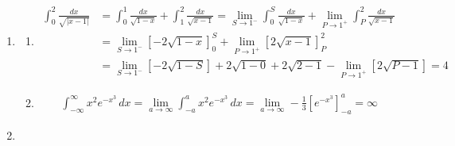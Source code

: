 \documentclass[a4paper, 12pt]{article}
\begin{document}
\begin{enumerate}[leftmargin=*,label=\textbf{\arabic*.}]
\begin{enumerate}[leftmargin=*,label=\textbf{\alph*.}]
\vspace{-2em}
\begin{align*}
\int\sqrt{t-t^2}\,dt=\boxed{\frac14\left[\arcsin\left(\sqrt t\right)-\sqrt{t(1-t)}\cdot(1-2t)\right]+C,\quad C\in\mathbb{R}}
\end{align*}

\item Let $u=\sqrt{1+\sqrt x}$.
\[u^2 = 1+\sqrt x\implies u^2-1 = \sqrt x\implies\left(u^2-1\right)^2 = x\implies2\left(u^2-1\right)\cdot 2u\,du = dx\]

\vspace{-2em}
\begin{align*}
\int \sqrt{1+\sqrt{x}}\,dx&=\int u \cdot(2u^2-2)\cdot 2u\,du=\int\left(4u^4-4u^2\right)\,du=\frac{4u^5}5-\frac{4u^3}{3} + c\\[1em]&=\boxed{\frac{4\left(\sqrt{1+\sqrt x}\right)^5}5-\frac{4\left(\sqrt{1+\sqrt x}\right)^3}3+C,\quad C\in\mathbb{R}}\end{align*}
\end{enumerate}

\item \begin{enumerate}[leftmargin=*,label=\textbf{\alph*.}]
\item\leavevmode

\vspace{-4em}
\begin{align*}
\int_0^2\frac{dx}{\sqrt{|x-1|}}&=\int_0^1\frac{dx}{\sqrt{1-x}} + \int_1^2\frac{dx}{\sqrt{x-1}}=\lim_{S\to1^-}\int_0^S\frac{dx}{\sqrt{1-x}}+\lim_{P\to1^+}\int_P^2\frac{dx}{\sqrt{x-1}}\\[1em]&=\lim_{S\to1^-}\left[-2\sqrt{1-x}\right]_0^S+\lim_{P\to1^+}\left[2\sqrt{x-1}\right]_P^2\\[1em]&=\lim_{S\to1^-}\left[-2\sqrt{1-S}\right]+2\sqrt{1-0}+2\sqrt{2-1}-\lim_{P\to1^+}\left[2\sqrt{P-1}\right]=\boxed4
\end{align*}

\item\leavevmode

\vspace{-4em}
\begin{align*}\int_{-\infty}^{\infty} x^2 e^{-x^{3}}\,dx=\lim_{a\to\infty}\int_{-a}^{a} x^2 e^{-x^{3}}\,dx=\lim_{a\to\infty}-\frac13\left[ e^{-x^3}\right]_{-a}^a=\boxed\infty\end{align*}
\end{enumerate}

\item\leavevmode


\end{enumerate}
\end{document}
